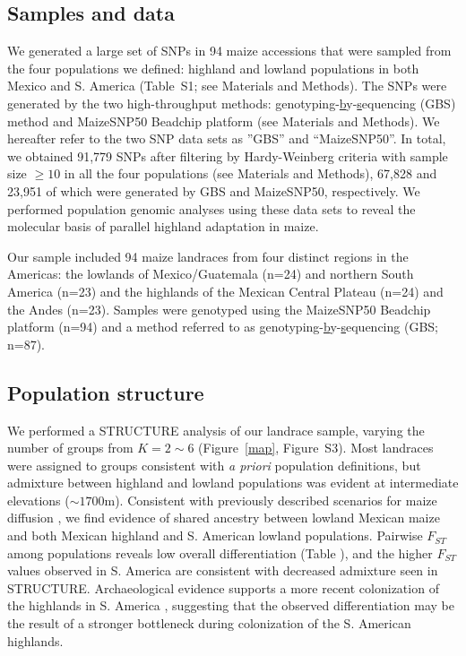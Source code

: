 \subsection*{Samples and data}
We generated a large set of SNPs in 94 maize accessions that were sampled from the four populations we defined: highland and lowland populations in both Mexico and S. America (Table~S1; see Materials and Methods).
The SNPs were generated by the two high-throughput methods: \underline{g}enotyping-\underline{b}y-\underline{s}equencing (GBS) method and MaizeSNP50 Beadchip platform (see Materials and Methods).  
We hereafter refer to the two SNP data sets as ''GBS'' and ``MaizeSNP50''.
In total, we obtained 91,779 SNPs after filtering by Hardy-Weinberg criteria with sample size $\geq10$ in all the four populations (see Materials and Methods), 67,828 and 23,951 of which were generated by GBS and MaizeSNP50, respectively.  
We performed population genomic analyses using these data sets to reveal the molecular basis of parallel highland adaptation in maize.

Our sample included 94 maize landraces from four distinct regions in the Americas: the lowlands of Mexico/Guatemala (n=24) and northern South America (n=23) and the highlands of the Mexican Central Plateau (n=24) and the Andes (n=23). Samples were genotyped using the MaizeSNP50 Beadchip platform (n=94) and a method referred to as \underline{g}enotyping-\underline{b}y-\underline{s}equencing (GBS; n=87).

\subsection*{Population structure}

We performed a {\sf STRUCTURE} analysis \cite[]{Pritchard_2000_10835412,Falush_2003_12930761} of our landrace sample, varying the number of groups from $K=2\sim 6$ (Figure~\ref{map}, Figure~S3). 
Most landraces were assigned to groups consistent with \emph{a priori} population definitions, but admixture between highland and lowland populations was evident at intermediate elevations ($\sim1700$m).  Consistent with previously described scenarios for maize diffusion \cite[]{Piperno_2006_69}, we find evidence of shared ancestry between lowland Mexican maize and both Mexican highland and S. American lowland populations.  Pairwise $F_{ST}$ among populations reveals low overall differentiation (Table \label{FstP}), and the higher $F_{ST}$ values observed in S. America are consistent with decreased admixture seen in STRUCTURE.  Archaeological evidence supports a more recent colonization of the highlands in S. America  \cite[]{Piperno_2006_69,Perry_2006_16511492,Grobman_2012_22307642}, suggesting that the observed differentiation may be the result of a stronger  bottleneck during colonization of the S. American highlands. 

